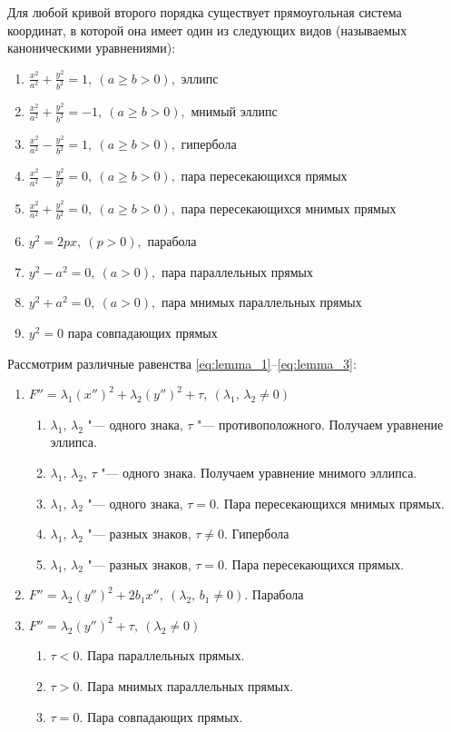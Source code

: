 \begin{theorem}
  \label{theorem:second}
  Для любой кривой второго порядка существует прямоугольная система координат, в которой она имеет один из следующих видов (называемых каноническими уравнениями):
  \begin{enumerate}
    \item $\frac{x^2}{a^2} + \frac{y^2}{b^2} = 1, ~(a \geq b > 0),$ эллипс 
    \item  $\frac{x^2}{a^2} + \frac{y^2}{b^2} = -1, ~(a \geq b > 0),$ мнимый эллипс 
    \item  $\frac{x^2}{a^2} - \frac{y^2}{b^2} = 1, ~(a \geq b > 0),$ гипербола
    \item  $\frac{x^2}{a^2} - \frac{y^2}{b^2} = 0, ~(a \geq b > 0),$ пара пересекающихся прямых
    \item $\frac{x^2}{a^2} + \frac{y^2}{b^2} = 0, ~(a \geq b > 0),$ пара пересекающихся мнимых прямых 
    \item $y^2 = 2px, ~ (p > 0),$ парабола
    \item $y^2 - a^2 = 0, ~ (a > 0),$ пара параллельных прямых
    \item $y^2 + a^2 = 0, ~ (a > 0),$ пара мнимых параллельных прямых
    \item $y^2 = 0$ пара совпадающих прямых
  \end{enumerate}
\end{theorem}

Рассмотрим различные равенства \ref{eq:lemma_1}--\ref{eq:lemma_3}:
\begin{enumerate}
  \item $F'' = \lambda_1(x'')^2 + \lambda_2(y'')^2 + \tau, ~ (\lambda_1,\, \lambda_2 \neq 0)$
  \begin{enumerate}[label = \alph*)]
    \item $\lambda_1, \, \lambda_2$ "--- одного знака, $\tau$ "--- противоположного. Получаем уравнение эллипса.
    \item $\lambda_1, \, \lambda_2, \, \tau$ "--- одного знака. Получаем уравнение мнимого эллипса.
    \item $\lambda_1, \, \lambda_2$ "--- одного знака, $\tau = 0$. Пара пересекающихся мнимых прямых.
    \item $\lambda_1, \, \lambda_2$ "--- разных знаков, $\tau \neq 0$. Гипербола
    \item $\lambda_1, \, \lambda_2$ "--- разных знаков, $\tau = 0$. Пара пересекающихся прямых.
  \end{enumerate}
  \item $F'' = \lambda_2(y'')^2 + 2b_1x'', ~ (\lambda_2, \, b_1 \neq 0)$. Парабола
  \item $ F'' = \lambda_2(y'')^2 + \tau, ~ (\lambda_2 \neq 0)$
  \begin{enumerate}[label = \alph*)]
    \item $\tau < 0$. Пара параллельных прямых.
    \item $\tau > 0$. Пара мнимых параллельных прямых.
    \item $\tau = 0$. Пара совпадающих прямых.
  \end{enumerate}
\end{enumerate}

